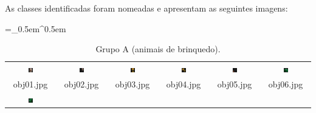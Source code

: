 As classes identificadas foram nomeadas e apresentam as seguintes imagens:

\begin{table}[H]
  \centering
  \caption{Grupo A (animais de brinquedo).}
  \tabulinesep =_0.5em^0.5em
  \everyrow{\tabucline[0.4pt]-}
  \begin{tabu}{|cccccc|}
    \includegraphics[width=0.1\textwidth,height=0.1\textwidth]{imagens/coil_100/animais_brinquedos/obj14__0.png} &
    \includegraphics[width=0.1\textwidth,height=0.1\textwidth]{imagens/coil_100/animais_brinquedos/obj14__0_1.png} &
    \includegraphics[width=0.1\textwidth,height=0.1\textwidth]{imagens/coil_100/animais_brinquedos/obj17__0.png} &
    \includegraphics[width=0.1\textwidth,height=0.1\textwidth]{imagens/coil_100/animais_brinquedos/obj17__0_1.png} &
    \includegraphics[width=0.1\textwidth,height=0.1\textwidth]{imagens/coil_100/animais_brinquedos/obj20__0.png} &
    \includegraphics[width=0.1\textwidth,height=0.1\textwidth]{imagens/coil_100/animais_brinquedos/obj28__275.png}
    \\
    \scriptsize{obj01.jpg} & \scriptsize{obj02.jpg} & \scriptsize{obj03.jpg} &
    \scriptsize{obj04.jpg} & \scriptsize{obj05.jpg} & \scriptsize{obj06.jpg}
    \\
    \includegraphics[width=0.1\textwidth,height=0.1\textwidth]{imagens/coil_100/animais_brinquedos/obj28__275_1.png} &

\end{tabu}
\end{table}
